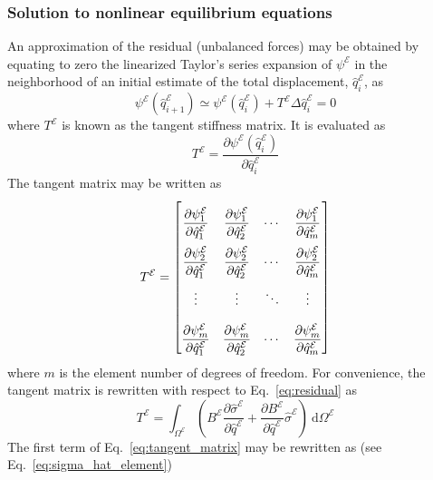 \documentclass[12pt]{article}
\numberwithin{equation}{section}
\newcommand{\pdiff}[2]{ \frac{\partial #1}{ \partial #2} }
\newcommand{\dpdiff}[2]{ \dfrac{\partial #1}{ \partial #2} }
\def\el{{ \mathcal{E} }}
\begin{document}
\subsubsection{Solution to nonlinear equilibrium equations}
An approximation of the residual (unbalanced forces) may be obtained by equating to zero the linearized Taylor's series expansion of \( \psi^\el\) in the neighborhood of an initial estimate of the total displacement, \( \hat{q}^\el_i \), as
%
\begin{equation}
    \psi^\el ( \hat{q}^\el_{i+1} ) \simeq
    \psi^\el ( \hat{q}^\el_i ) +
    T^\el \Delta \hat{q}^\el_{i} = 0
\end{equation}
%
where \( T^\el \) is known as the tangent stiffness matrix. It is evaluated as
%
\begin{equation}
    T^\el = \pdiff{\psi^\el ( \hat{q}^\el_i )}{\hat{q}^\el_i}
\end{equation}
%
The tangent matrix may be written as
% 
\begin{equation}
    {\renewcommand\arraystretch{2.5}
        T^\el =
        \begin{bmatrix}
            \dpdiff{\psi^\el_{1}}{\hat{q}^\el_{1}} & \dpdiff{\psi^\el_{1}}{\hat{q}^\el_{2}} & \cdots & \dpdiff{\psi^\el_{1}}{\hat{q}^\el_{m}} \\
            \dpdiff{\psi^\el_{2}}{\hat{q}^\el_{1}} & \dpdiff{\psi^\el_{2}}{\hat{q}^\el_{2}} & \cdots & \dpdiff{\psi^\el_{2}}{\hat{q}^\el_{m}} \\
            \vdots                                 & \vdots                                 & \ddots & \vdots                                 \\
            \dpdiff{\psi^\el_{m}}{\hat{q}^\el_{1}} & \dpdiff{\psi^\el_{m}}{\hat{q}^\el_{2}} & \cdots & \dpdiff{\psi^\el_{m}}{\hat{q}^\el_{m}} \\
        \end{bmatrix}
    }
\end{equation}
%
where \(m\) is the element number of degrees of freedom. For convenience, the tangent matrix is rewritten with respect to Eq.~\eqref{eq:residual} as
%
\begin{equation}
    T^\el = \int_{\Omega^\el}
    \left(
    B^\el \pdiff{\hat{\sigma}^\el}{\hat{q}^\el} +
    \pdiff{B^\el}{\hat{q}^\el} \hat{\sigma}^\el
    \right)
    ~ \text{d}\Omega^\el
    \label{eq:tangent_matrix}
\end{equation}
%
The first term of Eq.~\eqref{eq:tangent_matrix} may be rewritten as (see Eq.~\eqref{eq:sigma_hat_element})
\end{document}
